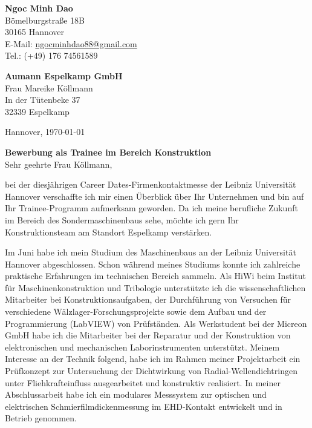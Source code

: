 \documentclass[11pt,a4paper]{letter}
\newcommand{\FirmaName}{Aumann Espelkamp GmbH}
\newcommand{\FirmaAdresseLineOne}{In der Tütenbeke 37}
\newcommand{\FirmaAdresseLineTwo}{32339 Espelkamp}
\newcommand{\AnsprechpartnerVoll}{Frau Mareike Köllmann}
\newcommand{\Ansprechpartner}{Maier}
\newcommand{\Ansprechpartnerin}{Köllmann}
\begin{document}
\pagestyle{empty}

\begin{flushleft}
    \textbf{Ngoc Minh Dao}\\
    Bömelburgstraße 18B\\
    30165 Hannover\\
    E-Mail: \href{mailto:ngocminhdao88@gmail.com}{ngocminhdao88@gmail.com}\\
    Tel.: (+49) 176 74561589
\end{flushleft}

\begin{flushleft}
    \textbf{\FirmaName}\\
    \AnsprechpartnerVoll\\
    \FirmaAdresseLineOne\\
    \FirmaAdresseLineTwo\\
\end{flushleft}

\begin{flushright}
    Hannover, \today
\end{flushright}

\textbf{Bewerbung als Trainee im Bereich Konstruktion}\\

Sehr geehrte Frau \Ansprechpartnerin,

bei der diesjährigen Career Dates-Firmenkontaktmesse der Leibniz Universität Hannover verschaffte ich mir einen Überblick über Ihr Unternehmen und bin auf Ihr Trainee-Programm aufmerksam geworden.
Da ich meine berufliche Zukunft im Bereich des Sondermaschinenbaus sehe, möchte ich gern Ihr Konstruktionsteam am Standort Espelkamp verstärken.

Im Juni habe ich mein Studium des Maschinenbaus an der Leibniz Universität Hannover abgeschlossen.
Schon während meines Studiums konnte ich zahlreiche praktische Erfahrungen im technischen Bereich sammeln.
Als HiWi beim Institut für Maschinenkonstruktion und Tribologie unterstützte ich die wissenschaftlichen Mitarbeiter bei Konstruktionsaufgaben, der Durchführung von Versuchen für verschiedene Wälzlager-Forschungsprojekte sowie dem Aufbau und der Programmierung (LabVIEW) von Prüfständen.
Als Werkstudent bei der Micreon GmbH habe ich die Mitarbeiter bei der Reparatur und der Konstruktion von elektronischen und mechanischen Laborinstrumenten unterstützt.
Meinem Interesse an der Technik folgend, habe ich im Rahmen meiner Projektarbeit ein Prüfkonzept zur Untersuchung der Dichtwirkung von Radial-Wellendichtringen unter Fliehkrafteinfluss ausgearbeitet und konstruktiv realisiert.
In meiner Abschlussarbeit habe ich ein modulares Messsystem zur optischen und elektrischen Schmierfilmdickenmessung im EHD-Kontakt entwickelt und in Betrieb genommen.
\end{document}
